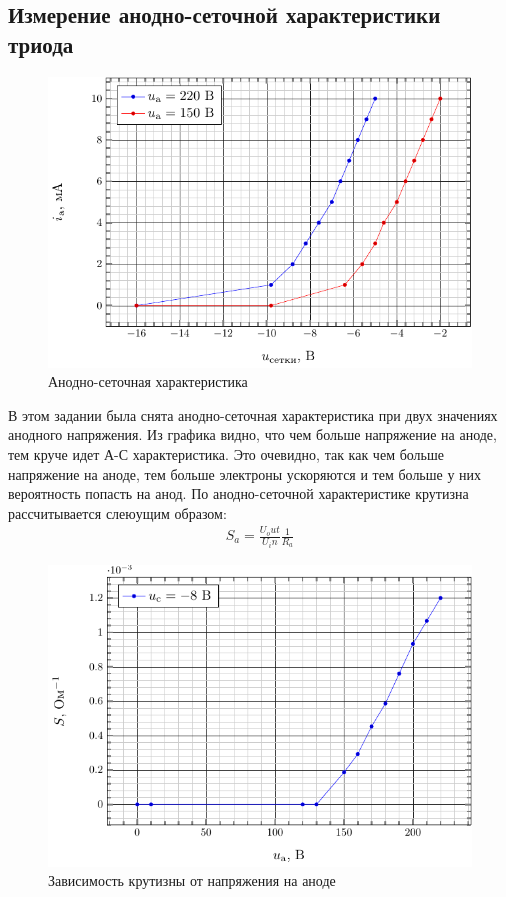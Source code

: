 \documentclass[a5paper,11pt]{extarticle}
\begin{document}
\subsection{Измерение анодно-сеточной характеристики триода} %
\begin{figure}[H]
	\centering
	\includegraphics[]{fig/ia_from_uc.pdf}
	\vspace{-1em}
	\caption{Анодно-сеточная характеристика}
	\label{fig:1}
\end{figure}

В этом задании была снята анодно-сеточная характеристика при двух значениях анодного напряжения. Из графика видно, что чем больше напряжение на аноде, тем круче идет А-С характеристика. Это очевидно, так как чем больше напряжение на аноде, тем больше электроны ускоряются и тем больше у них вероятность попасть на анод.
По анодно-сеточной характеристике крутизна рассчитывается слеюущим образом: 
\begin{gather}
	S_a=\frac{U_out}{U_in}\frac{1}{R_a}
\end{gather}
\begin{figure}[H]
	\centering
	\includegraphics[]{fig/s_from_ua.pdf}
	\vspace{-1em}
	\caption{Зависимость крутизны от напряжения на аноде}
	\label{fig:1}
\end{figure}
\end{document}
